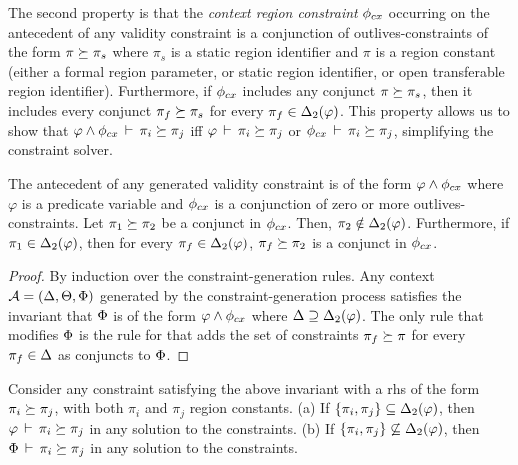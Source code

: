 The second property is that the \emph{context region constraint} $\phi_{cx}$
occurring on the antecedent of any validity constraint is a conjunction of
outlives-constraints of the form $\pi \succeq \pi_s$ where $\pi_s$
is a static region identifier and $\pi$ is a region constant (either a formal
region parameter, or static region identifier, or open transferable region identifier).
Furthermore, if $\phi_{cx}$ includes any conjunct $\pi \succeq \pi_s$, then
it includes every conjunct $\pi_f \succeq \pi_s$ for every $\pi_f \in {\Delta_2}(\varphi)$.
This property allows us to show that $\varphi \wedge \phi_{cx}\,\vdash\,\pi_i \succeq \pi_j$
iff $\varphi\,\vdash\,\pi_i \succeq \pi_j$ or $\phi_{cx}\,\vdash\,\pi_i \succeq \pi_j$,
simplifying the constraint solver.

\begin{lemma}
The antecedent of any generated validity constraint is of the form
$\varphi \wedge \phi_{cx}$ where $\varphi$ is a predicate variable and
$\phi_{cx}$ is a conjunction of zero or more outlives-constraints.
Let $\pi_1 \succeq \pi_2$ be a conjunct in $\phi_{cx}$.
Then, $\pi_2 \notin {\Delta_2}(\varphi)$.
Furthermore, if $\pi_1 \in {\Delta_2}(\varphi)$, then for
every $\pi_f \in {\Delta_2}(\varphi)$, $\pi_f \succeq \pi_2$ is
a conjunct in $\phi_{cx}$.
\end{lemma}

\begin{proof}
  By induction over the constraint-generation rules.
  Any context ${\mathcal{A}} = (\Delta,\Theta,\Phi)$ generated by the constraint-generation
  process satisfies the invariant that $\Phi$ is of the form $\varphi \wedge \phi_{cx}$
  where $\Delta \supseteq {\Delta_2}(\varphi)$.
  The only rule that modifies $\Phi$ is the rule for 
  that adds the set of constraints $\pi_f \succeq \pi$ for every $\pi_f \in \Delta$
  as conjuncts to $\Phi$.
\end{proof}

\begin{lemma}
  Consider any constraint satisfying the above invariant with a rhs of the
  form $\pi_i \succeq \pi_j$, with both $\pi_i$ and $\pi_j$ region constants.
  (a) If $\{ \pi_i, \pi_j \} \subseteq {\Delta_2}(\varphi)$,
  then $\varphi\,\vdash\,\pi_i \succeq \pi_j$ in any solution to the constraints.
  (b) If $\{ \pi_i, \pi_j \} \not \subseteq {\Delta_2}(\varphi)$,
  then $\Phi\,\vdash\,\pi_i \succeq \pi_j$ in any solution to the constraints.
\end{lemma}

